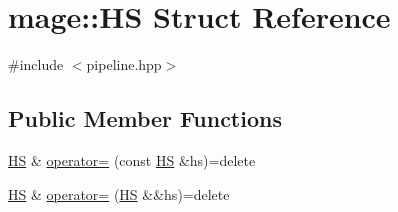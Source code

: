 \hypertarget{structmage_1_1_h_s}{}\section{mage\+:\+:HS Struct Reference}
\label{structmage_1_1_h_s}


{\ttfamily \#include $<$pipeline.\+hpp$>$}

\subsection*{Public Member Functions}
\begin{DoxyCompactItemize}
\item 
\hyperlink{structmage_1_1_h_s}{HS} \& \hyperlink{structmage_1_1_h_s_a6f3db7dc4d7413e786dc5d3b329f7312}{operator=} (const \hyperlink{structmage_1_1_h_s}{HS} \&hs)=delete
\item 
\hyperlink{structmage_1_1_h_s}{HS} \& \hyperlink{structmage_1_1_h_s_aadf0fc6780e03527497a40f1c2de14ab}{operator=} (\hyperlink{structmage_1_1_h_s}{HS} \&\&hs)=delete
\end{DoxyCompactItemize}
